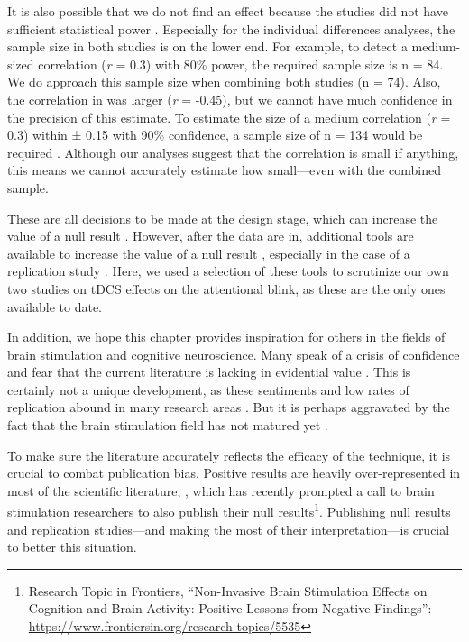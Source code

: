 \documentclass[11pt,]{memoir}
\let\rmarkdownfootnote\footnote%
\def\footnote{\protect\rmarkdownfootnote}
\begin{document}
It is also possible that we do not find an effect because the studies did not have sufficient statistical power \autocite{Minarik2016}. Especially for the individual differences analyses, the sample size in both studies is on the lower end. For example, to detect a medium-sized correlation (\emph{r} = 0.3) with 80\% power, the required sample size is n = 84. We do approach this sample size when combining both studies (n = 74). Also, the correlation in \textcite{London2015} was larger (\emph{r} = -0.45), but we cannot have much confidence in the precision of this estimate. To estimate the size of a medium correlation (\emph{r} = 0.3) within ± 0.15 with 90\% confidence, a sample size of n = 134 would be required \autocite{Schonbrodt2013}. Although our analyses suggest that the correlation is small if anything, this means we cannot accurately estimate how small---even with the combined sample.

These are all decisions to be made at the design stage, which can increase the value of a null result \autocite{DeGraaf2018}. However, after the data are in, additional tools are available to increase the value of a null result \autocite{Harms2018}, especially in the case of a replication study \autocite{Simonsohn2015}. Here, we used a selection of these tools to scrutinize our own two studies on tDCS effects on the attentional blink, as these are the only ones available to date.

In addition, we hope this chapter provides inspiration for others in the fields of brain stimulation and cognitive neuroscience. Many speak of a crisis of confidence \autocite{Heroux2017} and fear that the current literature is lacking in evidential value \autocite{Medina2017}. This is certainly not a unique development, as these sentiments \autocite{Baker2015} and low rates of replication abound in many research areas \autocites{OSC2015}{Camerer2018}{Klein2018}. But it is perhaps aggravated by the fact that the brain stimulation field has not matured yet \autocite{Parkin2015}.

To make sure the literature accurately reflects the efficacy of the technique, it is crucial to combat publication bias. Positive results are heavily over-represented in most of the scientific literature, \autocites{Ferguson2012}{Franco2014}{Fanelli2012}, which has recently prompted a call to brain stimulation researchers to also publish their null results\footnote{Research Topic in Frontiers, ``Non-Invasive Brain Stimulation Effects on Cognition and Brain Activity: Positive Lessons from Negative Findings'': \url{https://www.frontiersin.org/research-topics/5535}}. Publishing null results and replication studies---and making the most of their interpretation---is crucial to better this situation.
\end{document}
